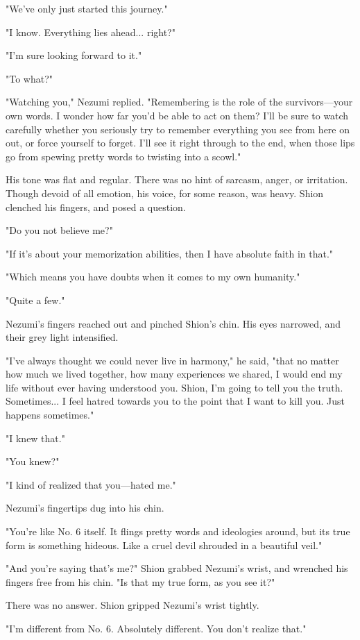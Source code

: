 "We've only just started this journey."

"I know. Everything lies ahead... right?"

"I'm sure looking forward to it."

"To what?"

"Watching you," Nezumi replied. "Remembering is the role of the
survivors---your own words. I wonder how far you'd be able to act on them?
I'll be sure to watch carefully whether you seriously try to remember
everything you see from here on out, or force yourself to forget. I'll
see it right through to the end, when those lips go from spewing pretty
words to twisting into a scowl."

His tone was flat and regular. There was no hint of sarcasm, anger, or
irritation. Though devoid of all emotion, his voice, for some reason,
was heavy. Shion clenched his fingers, and posed a question.

"Do you not believe me?"

"If it's about your memorization abilities, then I have absolute faith
in that."

"Which means you have doubts when it comes to my own humanity."

"Quite a few."

Nezumi's fingers reached out and pinched Shion's chin. His eyes
narrowed, and their grey light intensified.

"I've always thought we could never live in harmony," he said, "that no
matter how much we lived together, how many experiences we shared, I
would end my life without ever having understood you. Shion, I'm going
to tell you the truth. Sometimes... I feel hatred towards you to the
point that I want to kill you. Just happens sometimes."

"I knew that."

"You knew?"

"I kind of realized that you---hated me."

Nezumi's fingertips dug into his chin.

"You're like No. 6 itself. It flings pretty words and ideologies around,
but its true form is something hideous. Like a cruel devil shrouded in a
beautiful veil."

"And you're saying that's me?" Shion grabbed Nezumi's wrist, and
wrenched his fingers free from his chin. "Is that my true form, as you
see it?"

There was no answer. Shion gripped Nezumi's wrist tightly.

"I'm different from No. 6. Absolutely different. You don't realize
that."

